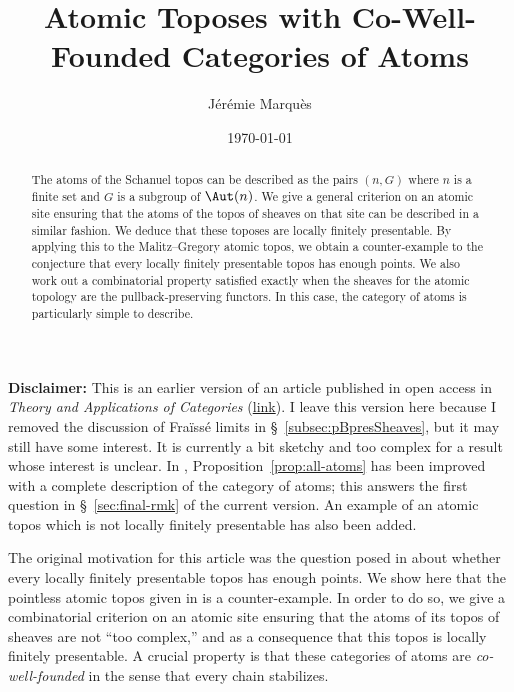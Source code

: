 \documentclass[numberwithin=section]{papier}
\title{Atomic Toposes with Co-Well-Founded Categories of Atoms}
\author{Jérémie Marquès}
\date{\today}
\begin{document}
\maketitle

\textbf{Disclaimer:} This is an earlier version of an article published in open access in \emph{Theory and Applications of Categories} \cite{MarAtomicToposesCoWellFounded2025} (\href{http://www.tac.mta.ca/tac/volumes/44/15/44-15abs.html}{link}). I leave this version here because I removed the discussion of Fraïssé limits in §~\ref{subsec:pBpresSheaves}, but it may still have some interest. It is currently a bit sketchy and too complex for a result whose interest is unclear. In \cite{MarAtomicToposesCoWellFounded2025}, Proposition~\ref{prop:all-atoms} has been improved with a complete description of the category of atoms; this answers the first question in §~\ref{sec:final-rmk} of the current version. An example of an atomic topos which is not locally finitely presentable has also been added.

\begin{abstract}
	The atoms of the Schanuel topos can be described as the pairs $(n,G)$ where $n$ is a finite set and $G$ is a subgroup of $\Aut(n)$. We give a general criterion on an atomic site ensuring that the atoms of the topos of sheaves on that site can be described in a similar fashion. We deduce that these toposes are locally finitely presentable. By applying this to the Malitz--Gregory atomic topos, we obtain a counter-example to the conjecture that every locally finitely presentable topos has enough points. We also work out a combinatorial property satisfied exactly when the sheaves for the atomic topology are the pullback-preserving functors. In this case, the category of atoms is particularly simple to describe.
\end{abstract}

\showcontents
\vspace{1em}

The original motivation for this article was the question posed in \cite{dilibertiTopoiEnoughPoints2024} about whether every locally finitely presentable topos has enough points. We show here that the pointless atomic topos given in \cite[Sec.~5]{makkaiFullContinuousEmbeddings1982} is a counter-example. In order to do so, we give a combinatorial criterion on an atomic site ensuring that the atoms of its topos of sheaves are not ``too complex,'' and as a consequence that this topos is locally finitely presentable. A crucial property is that these categories of atoms are \emph{co-well-founded} in the sense that every chain stabilizes.
\end{document}
